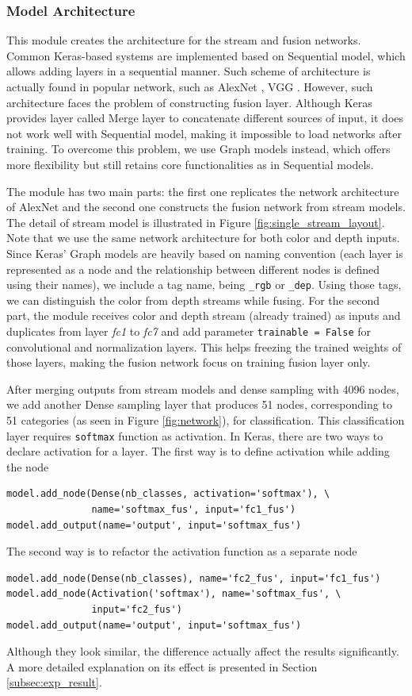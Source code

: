 \subsubsection{Model Architecture}
This module creates the architecture for the stream and fusion networks. Common Keras-based systems are implemented based on Sequential model, which allows adding layers in a sequential manner. Such scheme of architecture is actually found in popular network, such as AlexNet \cite{Krizhevsky2012_alexnet}, VGG \cite{Simonyan2014_vgg}. However, such architecture faces the problem of constructing fusion layer. Although Keras provides layer called Merge layer to concatenate different sources of input, it does not work well with Sequential model, making it impossible to load networks after training. To overcome this problem, we use Graph models instead, which offers more flexibility but still retains core functionalities as in Sequential models.

The module has two main parts: the first one replicates the network architecture of AlexNet and the second one constructs the fusion network from stream models. The detail of stream model is illustrated in Figure \ref{fig:single_stream_layout}. Note that we use the same network architecture for both color and depth inputs. Since Keras' Graph models are heavily based on naming convention (each layer is represented as a node and the relationship between different nodes is defined using their names), we include a tag name, being \texttt{\_rgb} or \texttt{\_dep}. Using those tags, we can distinguish the color from depth streams while fusing. For the second part, the module receives color and depth stream (already trained) as inputs and duplicates from layer \textit{fc1} to \textit{fc7} and add parameter \texttt{trainable = False} for convolutional and normalization layers. This helps freezing the trained weights of those layers, making the fusion network focus on training fusion layer only.

After merging outputs from stream models and dense sampling with 4096 nodes, we add another Dense sampling layer that produces 51 nodes, corresponding to 51 categories (as seen in Figure \ref{fig:network}), for classification. This classification layer requires \texttt{softmax} function as activation. In Keras, there are two ways to declare activation for a layer. The first way is to define activation while adding the node
\begin{verbatim}
model.add_node(Dense(nb_classes, activation='softmax'), \
               name='softmax_fus', input='fc1_fus')
model.add_output(name='output', input='softmax_fus')
\end{verbatim}
The second way is to refactor the activation function as a separate node
\begin{verbatim}
model.add_node(Dense(nb_classes), name='fc2_fus', input='fc1_fus')
model.add_node(Activation('softmax'), name='softmax_fus', \
               input='fc2_fus')
model.add_output(name='output', input='softmax_fus')
\end{verbatim}
Although they look similar, the difference actually affect the results significantly. A more detailed explanation on its effect is presented in Section \ref{subsec:exp_result}.

